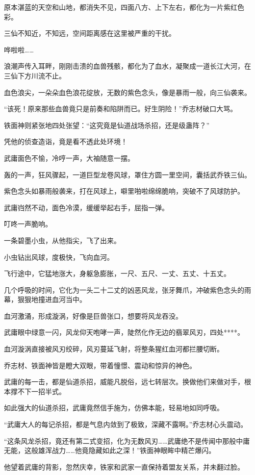 \begin{this_body}
原本湛蓝的天空和山地，都消失不见，四面八方、上下左右，都化为一片紫红色彩。

三仙不知近，不知远，空间距离感在这里被严重的干扰。

哗啦啦……

浪潮声传入耳畔，刚刚击溃的血兽残骸，都化为了血水，凝聚成一道长江大河，在三仙下方川流不止。

血色浪尖，一朵朵血色浪花绽放，无数的紫色念头，像是暴雨一般，向三仙袭来。

“该死！原来那些血兽竟只是前奏和陷阱而已。好生阴险！”乔志材破口大骂。

铁面神则紧张地四处张望：“这究竟是仙道战场杀招，还是级蛊阵？”

凭他的侦查造诣，竟是看不透此处环境！

武庸面色不愉，冷哼一声，大袖随意一摆。

轰的一声，狂风骤起，一道巨型龙卷风球，罩住方圆一里空间，囊括武乔铁三仙。

紫色念头如暴雨般袭来，打在风球上，噼里啪啦绵绵脆响，突破不了风球防护。

武庸岿然不动，面色冷漠，缓缓举起右手，屈指一弹。

叮咚一声脆响。

一条碧墨小虫，从他指尖，飞了出来。

小虫钻出风球，度极快，飞向血河。

飞行途中，它猛地涨大，身躯急膨胀，一尺、五尺、一丈、五丈、十五丈。

几个呼吸的时间，它化为一头二十二丈的凶恶风龙，张牙舞爪，冲破紫色念头的雨幕，狠狠地撞进血河当中。

血河激涌，形成漩涡，好像是巨兽张口，想要将风龙吞没。

武庸眼中绿意一闪，风龙仰天咆哮一声，陡然化作无边的翡翠风刃，四处****。

血河漩涡直接被风刃绞碎，风刃蔓延飞射，将整条猩红血河都拦腰切断。

乔志材、铁面神皆是瞪大双眼，带着憧憬、震动和惊异的神色。

武庸的每一击，都是仙道杀招，威能凡脱俗，远七转层次。换做他们来做对手，根本撑不下一招半式。

如此强大的仙道杀招，武庸竟然信手施为，仿佛本能，轻易地如同呼吸。

“武庸大人的每记杀招，都是气息内敛到了极致，深藏不露啊。”乔志材心头震动。

“这条风龙杀招，竟还有第二式变招，化为无数风刃……武庸绝不是传闻中那般中庸无能，这般雄浑战力……他竟隐藏如此之深！”铁面神眼眸中精芒爆闪。

他望着武庸的背影，忽然庆幸，铁家和武家一直保持着盟友关系，并未翻过脸。


\end{this_body}
